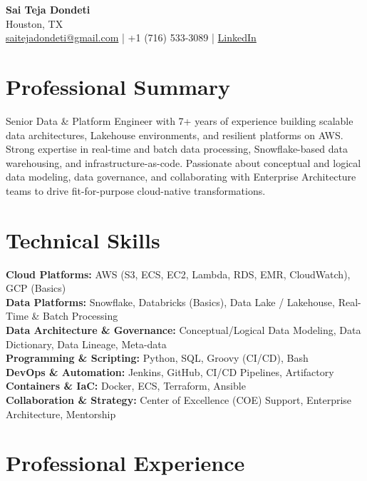 \documentclass[10pt]{article}
\begin{document}
\begin{center}
    {\LARGE \textbf{Sai Teja Dondeti}} \\
    \vspace{2pt}
    Houston, TX \\
    \href{mailto:saitejadondeti@gmail.com}{saitejadondeti@gmail.com} \;|\;
    +1 (716) 533-3089 \;|\;
    \href{https://www.linkedin.com/in/sai-teja-dondeti/}{LinkedIn}
\end{center}

\section*{Professional Summary}
Senior Data & Platform Engineer with 7+ years of experience building scalable data architectures, Lakehouse environments, and resilient platforms on AWS. Strong expertise in real-time and batch data processing, Snowflake-based data warehousing, and infrastructure-as-code. Passionate about conceptual and logical data modeling, data governance, and collaborating with Enterprise Architecture teams to drive fit-for-purpose cloud-native transformations.

\section*{Technical Skills}

\textbf{Cloud Platforms:} AWS (S3, ECS, EC2, Lambda, RDS, EMR, CloudWatch), GCP (Basics) \\
\textbf{Data Platforms:} Snowflake, Databricks (Basics), Data Lake / Lakehouse, Real-Time \& Batch Processing \\
\textbf{Data Architecture \& Governance:} Conceptual/Logical Data Modeling, Data Dictionary, Data Lineage, Meta-data \\
\textbf{Programming \& Scripting:} Python, SQL, Groovy (CI/CD), Bash \\
\textbf{DevOps \& Automation:} Jenkins, GitHub, CI/CD Pipelines, Artifactory \\
\textbf{Containers \& IaC:} Docker, ECS, Terraform, Ansible \\
\textbf{Collaboration \& Strategy:} Center of Excellence (COE) Support, Enterprise Architecture, Mentorship

\section*{Professional Experience}
\end{document}
